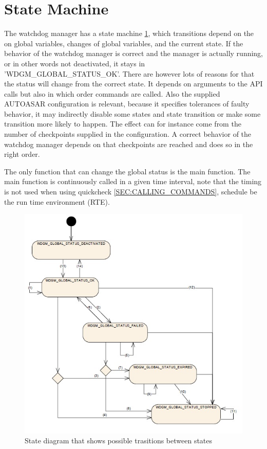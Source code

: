 
\section{State Machine}
The watchdog manager has a state machine \ref{FIG:GLOBALSTATUSES},
which transitions depend on the on global variables, changes of global
variables, and the current state. If the behavior of the watchdog manager is
correct and the manager is actually running, or in other words not deactivated,
it stays in 'WDGM\_GLOBAL\_STATUS\_OK'. There are however lots of reasons for
that the status will change from the correct state. It depends on arguments to
the API calls but also in which order commands are called. Also the supplied
AUTOASAR configuration is relevant, because it specifies tolerances of faulty
behavior, it may indirectly disable some states and state transition or make some
transition more likely to happen. The effect can for instance come from
the number of checkpoints supplied in the configuration. A correct behavior of
the watchdog manager depends on that checkpoints are reached and does so in the
right order.

The only function that can change the global status is the main function. The
main function is continuously called in a given time interval, note that the
timing is not used when using quickcheck \ref{SEC:CALLING_COMMANDS}, schedule be
the run time environment (RTE).


\begin{figure}[h!]
\label{FIG:GLOBALSTATUSES}
\caption{State diagram that shows possible trasitions between states}
\begin{center}
\includegraphics{pictures/globalstatuses.jpg}
\end{center}
\end{figure}



